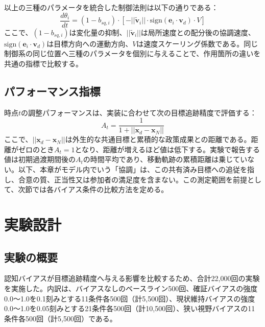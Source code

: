 以上の三種のパラメータを統合した制御法則は以下の通りである：
\begin{equation}
\frac{d\theta_i}{dt} = (1 - b_{sq,i}) \cdot \left[-||\tilde{\mathbf{v}}_i|| \cdot \text{sign}(\mathbf{e}_i \cdot \mathbf{v}_d) \cdot V\right]
\end{equation}
ここで、$(1 - b_{sq,i})$は変化量の抑制、$||\tilde{\mathbf{v}}_i||$は局所速度との配分後の協調速度、$\text{sign}(\mathbf{e}_i \cdot \mathbf{v}_d)$は目標方向への運動方向、$V$は速度スケーリング係数である。同じ制御系の同じ位置へ三種のパラメータを個別に与えることで、作用箇所の違いを共通の指標で比較する。

\subsection{パフォーマンス指標}

時点$t$の調整パフォーマンスは、実装に合わせて次の目標追跡精度で評価する：
\begin{equation}
A_t = \frac{1}{1 + ||\mathbf{x}_d - \mathbf{x}_N||}
\end{equation}
ここで、$||\mathbf{x}_d - \mathbf{x}_N||$は外生的な共通目標と累積的な政策成果との距離である。距離がゼロのとき$A_t=1$となり、距離が増えるほど値は低下する。実験で報告する値は初期過渡期間後の$A_t$の時間平均であり、移動軌跡の累積距離は乗じていない。以下、本章がモデル内でいう「協調」は、この共有済み目標への追従を指し、合意の質、正当性又は参加者の満足度を含まない。この測定範囲を前提として、次節では各バイアス条件の比較方法を定める。

\section{実験設計}
\label{sec:ch3_experiment}

\subsection{実験の概要}

認知バイアスが目標追跡精度へ与える影響を比較するため、合計22,000回の実験を実施した。内訳は、バイアスなしのベースライン500回、確証バイアスの強度0.0〜1.0を0.1刻みとする11条件各500回（計5,500回）、現状維持バイアスの強度0.0〜1.0を0.05刻みとする21条件各500回（計10,500回）、狭い視野バイアスの11条件各500回（計5,500回）である。

